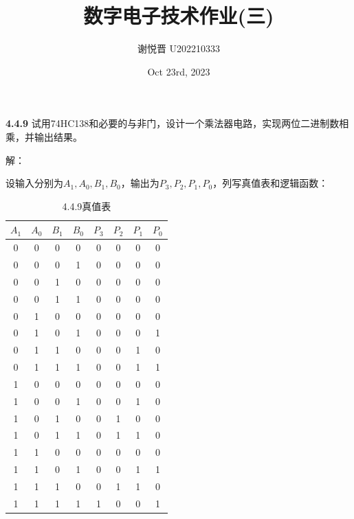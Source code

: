 \documentclass[a4paper,11pt,UTF8]{article}
\title{数字电子技术作业(三)}
\author{谢悦晋 \quad U202210333}
\date{Oct 23rd, 2023 }
\begin{document}
\maketitle
\textbf{4.4.9} 试用74HC138和必要的与非门，设计一个乘法器电路，实现两位二进制数相乘，并输出结果。

解：

设输入分别为$A_1,A_0,B_1,B_0$，输出为$P_3,P_2,P_1,P_0$，列写真值表和逻辑函数：

\begin{table}[h]
	\centering
	\caption*{4.4.9真值表}
	
	\begin{tabular}{cccc|cccc}
		\hline
		$A_1$ & $A_0$ & $B_1$ & $B_0$ & $P_3$ & $P_2$ & $P_1$ & $P_0$\\
		\hline
		0 & 0 & 0 & 0 & 0 & 0 & 0 & 0\\
		0 & 0 & 0 & 1 & 0 & 0 & 0 & 0\\
		0 & 0 & 1 & 0 & 0 & 0 & 0 & 0\\
		0 & 0 & 1 & 1 & 0 & 0 & 0 & 0\\
		0 & 1 & 0 & 0 & 0 & 0 & 0 & 0\\
		0 & 1 & 0 & 1 & 0 & 0 & 0 & 1\\
		0 & 1 & 1 & 0 & 0 & 0 & 1 & 0\\
		0 & 1 & 1 & 1 & 0 & 0 & 1 & 1\\
		1 & 0 & 0 & 0 & 0 & 0 & 0 & 0\\
		1 & 0 & 0 & 1 & 0 & 0 & 1 & 0\\
		1 & 0 & 1 & 0 & 0 & 1 & 0 & 0\\
		1 & 0 & 1 & 1 & 0 & 1 & 1 & 0\\
		1 & 1 & 0 & 0 & 0 & 0 & 0 & 0\\
		1 & 1 & 0 & 1 & 0 & 0 & 1 & 1\\
		1 & 1 & 1 & 0 & 0 & 1 & 1 & 0\\
		1 & 1 & 1 & 1 & 1 & 0 & 0 & 1\\
		\hline
	\end{tabular}
\end{table}
\end{document}
